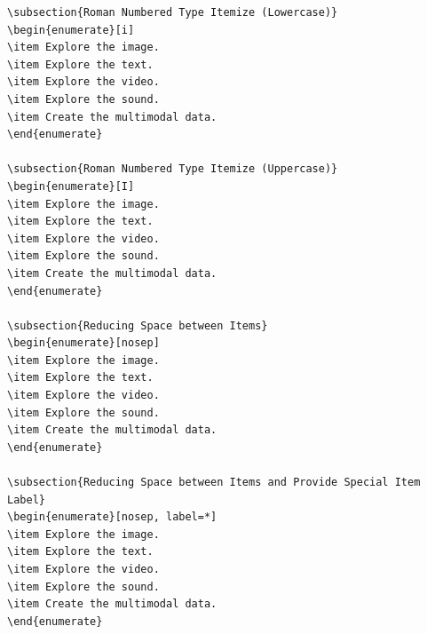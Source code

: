 \documentclass{article}
\begin{document}
\begin{lstlisting}
\subsection{Roman Numbered Type Itemize (Lowercase)}
\begin{enumerate}[i]
\item Explore the image.
\item Explore the text.
\item Explore the video.
\item Explore the sound.
\item Create the multimodal data.
\end{enumerate}

\subsection{Roman Numbered Type Itemize (Uppercase)}
\begin{enumerate}[I]
\item Explore the image.
\item Explore the text.
\item Explore the video.
\item Explore the sound.
\item Create the multimodal data.
\end{enumerate}

\subsection{Reducing Space between Items}
\begin{enumerate}[nosep]
\item Explore the image.
\item Explore the text.
\item Explore the video.
\item Explore the sound.
\item Create the multimodal data.
\end{enumerate}

\subsection{Reducing Space between Items and Provide Special Item Label}
\begin{enumerate}[nosep, label=*]
\item Explore the image.
\item Explore the text.
\item Explore the video.
\item Explore the sound.
\item Create the multimodal data.
\end{enumerate}


\end{lstlisting}
\end{document}
